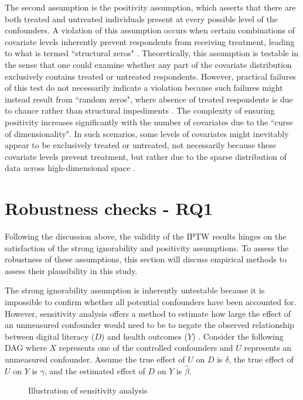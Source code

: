 The second assumption is the positivity assumption, which asserts that there are both treated and untreated individuals present at every possible level of the confounders. A violation of this assumption occurs when certain combinations of covariate levels inherently prevent respondents from receiving treatment, leading to what is termed ``structural zeros" \parencite{austin_moving_2015}. Theoretically, this assumption is testable in the sense that one could examine whether any part of the covariate distribution exclusively contains treated or untreated respondents. However, practical failures of this test do not necessarily indicate a violation because such failures might instead result from ``random zeros", where absence of treated respondents is due to chance rather than structural impediments \parencite{cole_constructing_2008}. The complexity of ensuring positivity increases significantly with the number of covariates due to the ``curse of dimensionality". In such scenarios, some levels of covariates might inevitably appear to be exclusively treated or untreated, not necessarily because these covariate levels prevent treatment, but rather due to the sparse distribution of data across high-dimensional space \parencite[p. 397]{morgan_counterfactuals_2014}.

\section{Robustness checks - RQ1}
Following the discussion above, the validity of the IPTW results hinges on the satisfaction of the strong ignorability and positivity assumptions. To assess the robustness of these assumptions, this section will discuss empirical methods to assess their plausibility in this study.

The strong ignorability assumption is inherently untestable because it is impossible to confirm whether all potential confounders have been accounted for. However, sensitivity analysis offers a method to estimate how large the effect of an unmeasured confounder would need to be to negate the observed relationship between digital literacy ($D$) and health outcomes ($Y$) \parencite{shen_sensitivity_2011}. Consider the following DAG where $X$ represents one of the controlled confounders and $U$ represents an unmeasured confounder. Assume the true effect of $U$ on $D$ is $\delta$, the true effect of $U$ on $Y$ is $\gamma$, and the estimated effect of $D$ on $Y$ is $\hat{\beta}$.

\begin{figure}[h!]
    \centering
    \caption{Illustration of sensitivity analysis}
    \label{fig:sense_dag}
\end{figure}

